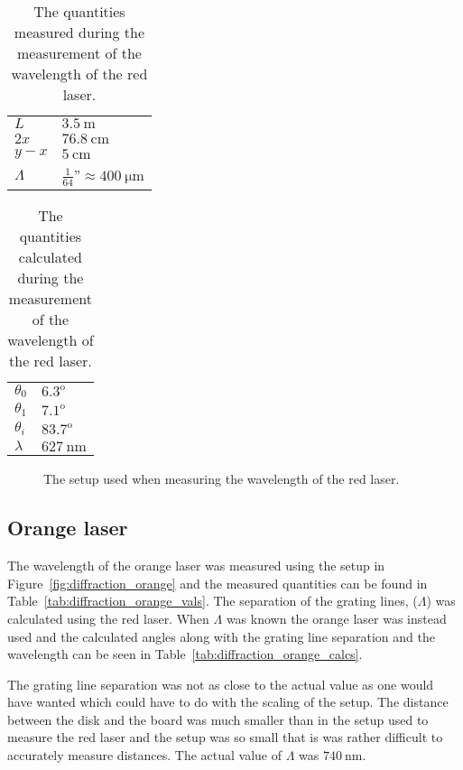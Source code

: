 \documentclass[12pt,a4paper]{article}
\begin{document}
\begin{table}
  \centering
  \begin{tabular}{|l|l|}\hline
    $L$ & $\SI{3.5}{\metre}$ \\
    $2x$ & $\SI{76.8}{\centi\metre}$ \\
    $y-x$ & $\SI{5}{\centi\metre}$ \\ 
    $\Lambda$ & $\frac{1}{64}$''$\approx\SI{400}{\micro\metre}$ \\ \hline
  \end{tabular}
  \caption{The quantities measured during the measurement of the wavelength of the red laser.}
  \label{tab:diffraction_red_vals}
\end{table}
\begin{table}
  \centering
  \begin{tabular}{|l|l|}\hline
    $\theta_0$ & $6.3^\text{o}$ \\
    $\theta_1$ & $7.1^\text{o}$ \\
    $\theta_i$ & $83.7^\text{o}$ \\
    $\lambda$ & $\SI{627}{\nano\metre}$ \\ \hline
  \end{tabular}
  \caption{The quantities calculated during the measurement of the wavelength of the red laser.}
  \label{tab:diffraction_red_calcs}
\end{table}
\begin{figure}
  \centering
  \noindent\makebox[\textwidth]{\scalebox{0.80}{}}
  \caption{The setup used when measuring the wavelength of the red laser.}
  \label{fig:diffraction_red}
\end{figure}
\subsection{Orange laser}
The wavelength of the orange laser was measured using the setup in Figure~\ref{fig:diffraction_orange} and the measured quantities can be found in Table~\ref{tab:diffraction_orange_vals}. The separation of the grating lines, ($\Lambda$) was calculated using the red laser. When $\Lambda$ was known the orange laser was instead used and the calculated angles along with the grating line separation and the wavelength can be seen in Table~\ref{tab:diffraction_orange_calcs}.

The grating line separation was not as close to the actual value as one would have wanted which could have to do with the scaling of the setup. The distance between the disk and the board was much smaller than in the setup used to measure the red laser and the setup was so small that is was rather difficult to accurately measure distances. The actual value of $\Lambda$ was $\SI{740}{\nano\metre}$.
\end{document}
